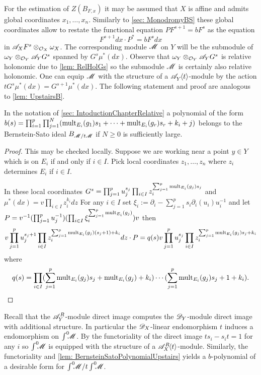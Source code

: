 \noindent
For the estimation of $Z(B_{F,x})$ it may be assumed that $X$ is affine and admits global coordinates $x_1,\ldots,x_n$.
Similarly to \cref{sec: MonodromyBS} these global coordinates allow to restate the functional equation $P F^{s+1} = b F^s$ as the equation
$$F^{s+1}dx \cdot P^* = b F^s dx $$
in $\mathscr{A}_X F^s \otimes_{\mathcal{O}_X}\omega_X$.
The corresponding module $\mathscr{M}$ on $Y$ will be the submodule of $\omega_Y\otimes_{\mathcal{O}_Y} \mathscr{A}_Y G^s$ spanned by $G^s \mu^*(dx)$.
Observe that $\omega_Y\otimes_{\mathcal{O}_Y} \mathscr{A}_Y G^s$ is relative holonomic due to \cref{lem: RelHolGs} so the submodule $\mathscr{M}$ is certainly also relative holonomic.
One can equip $\mathscr{M}$ with the structure of a $\mathscr{A}_{Y}^{}\mkern-5mu\left\langle t \right\rangle$-module by the action $t G^s \mu^*(dx) = G^{s+1} \mu^*(dx)$.
The following statement and proof are analogous to \cref{lem: UpstairsB}.
\begin{lemma}\label{lem: BernsteinSatoPolynomialUpstairs}
  In the notation of \cref{sec: IntoductionChapterRelative} a polynomial of the form
  $b(s)=\prod_{i=1}^p \prod_{j=1}^N(\operatorname{mult}_{E_i}(g_1)\allowbreak s_1 + \cdots + \operatorname{mult}_{E_i}(g_r)\allowbreak s_r + k_i + j)$
  belongs to the Bernstein-Sato ideal $B_{\mathscr{M}/t\mathscr{M}}$ if $N\geq 0$ is sufficiently large.
\end{lemma}
\begin{proof}
  This may be checked locally.
  Suppose we are working near a point $y\in Y$ which is on $E_i$ if and only if $i\in I$.
  Pick local coordinates $z_1,\ldots,z_n$ where $z_i$ determines $E_i$ if $i\in I$.

  In these local coordinates $G^s = \prod_{j=1}^p u_j^{s_j} \prod_{i\in I} z_i^{\sum_{j=1}^p \operatorname{mult}_{E_i}(g_j)s_j}$ and $\mu^*(dx) = v \prod_{i\in I} z_i^{k_i} dz$
  For any $i\in I$ set $\xi_i := \partial_i - \sum_{j=1}^{p}s_i\partial_i(u_i)u_i^{-1}$ and let $P = v^{-1}(\prod_{j=1}^p u_j^{-1}) (\prod_{i\in I}\xi_i^{\sum_{j=1}^p\operatorname{mult}_{E_i}(g_j)}) v$ then
  $$v\prod_{j=1}^p u_j^{s_j + 1}\prod_{i\in I}z_i^{\sum_{j=1}^p \operatorname{mult}_{E_i}(g_j)(s_j+1) + k_i}dz \cdot P =  q(s) v\prod_{j=1}^p u_j^{s_j}\prod_{i\in I}z_i^{\sum_{j=1}^p \operatorname{mult}_{E_i}(g_j)s_j + k_i} $$
  where
  $$q(s) = \prod_{i\in I}(\sum_{j=1}^p \operatorname{mult}_{E_i}(g_j)s_j + \operatorname{mult}_{E_i}(g_j) + k_i)\cdots(\sum_{j=1}^p \operatorname{mult}_{E_i}(g_j)s_j + 1 + k_i ).$$
\end{proof}
Recall that the $\mathscr{A}_Y^R$-module direct image computes the $\mathscr{D}_Y$-module direct image with additional structure.
In particular the $\mathscr{D}_X$-linear endomorphism $t$ induces a endomorphism on $\int^0 \mkern -8mu\mathscr{M}$.
By the functoriality of the direct image $ts_i - s_it = 1$ for any $i$ so $\int^0 \mkern -8mu\mathscr{M}$ is equipped with the structure of a $\mathscr{A}_X^R\mkern-5mu\left\langle t \right\rangle$-module.
Similarly, the functoriality and \cref{lem: BernsteinSatoPolynomialUpstairs} yields a $b$-polynomial of a desirable form for $\int^0 \mkern -8mu \mathscr{M}/t\int^0 \mkern -8mu\mathscr{M}$.

